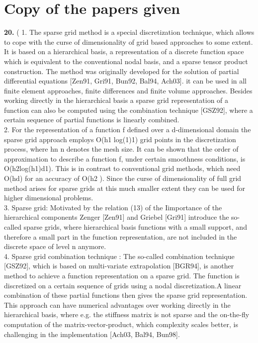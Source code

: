 \section{Copy of the papers given}

\textbf{20.}
(
1. The sparse grid method is a special discretization technique, which allows to cope with the curse of dimensionality of grid based approaches to some extent. It is based on a hierarchical basis, a representation of a discrete function space which is equivalent to the conventional nodal basis, and a sparse tensor product construction. 
The method was originally developed for the solution of partial differential equations [Zen91, Gri91, Bun92, Bal94, Ach03]. it can be used in all finite element approaches, finite differences and finite volume approaches.
Besides working directly in the hierarchical basis a sparse grid representation of a function can also be computed using the combination technique [GSZ92], where a certain sequence of partial functions is linearly combined.\cite{Garcke2006a}\\

2. For the representation of a function f defined over a d-dimensional domain the sparse grid approach employs O(h1 log(1)1) grid points in the discretization process, where hn n denotes the mesh size. It can be shown
that the order of approximation to describe a function f, under certain smoothness conditions, is O(h2log(h1)d1). This is in contrast to conventional grid methods, which need O(hd) for an accuracy of O(h2 ). Since the curse of dimensionality of full grid method arises for sparse grids at this much smaller extent they can be used for higher dimensional problems.\cite{Garcke2006a}\\

 3. Sparse grid: 
Motivated by the relation (13) of the Iimportance of the hierarchical components Zenger [Zen91] and Griebel [Gri91] introduce the so-called sparse grids, where hierarchical basis functions with a small support, and therefore a small part in the function representation, are not included in the discrete space of level n anymore.\cite{Garcke2006a}\\

4. Sparse grid combination technique : The so-called combination technique [GSZ92], which is based on multi-variate extrapolation [BGR94], is another method to achieve a function representation on a sparse grid. The function is discretized on a certain sequence of grids using a nodal discretization.A linear combination of these partial functions then gives the sparse grid representation. This approach can have numerical advantages over working directly in the hierarchical basis, where e.g. the stiffness matrix is not sparse and the on-the-fly computation of the matrix-vector-product, which complexity scales better, is challenging in the implementation [Ach03, Bal94, Bun98].\cite{Garcke2006a}\\

